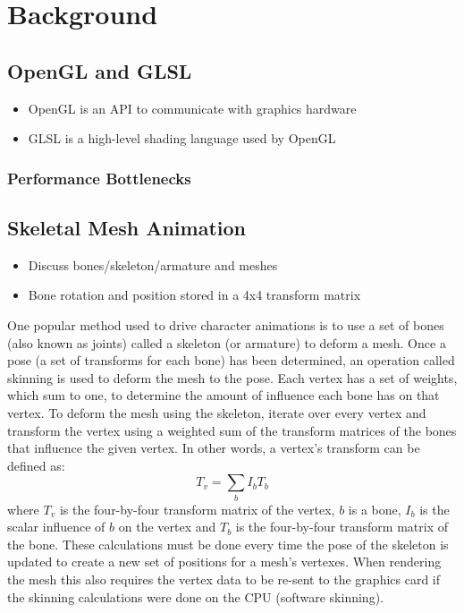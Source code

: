 \section{Background}

\subsection{OpenGL and GLSL}
\ifsummaries
\begin{itemize}
 \item OpenGL is an API to communicate with graphics hardware
 \item GLSL is a high-level shading language used by OpenGL
\end{itemize}
\fi


\subsubsection{Performance Bottlenecks}


\subsection{Skeletal Mesh Animation}
\ifsummaries
\begin{itemize}
 \item Discuss bones/skeleton/armature and meshes
 \item Bone rotation and position stored in a 4x4 transform matrix
\end{itemize}
\fi

One popular method used to drive character animations is to use a set of bones (also known as joints) called a skeleton (or armature) to deform a mesh.
Once a pose (a set of transforms for each bone) has been determined, an operation called skinning is used to deform the mesh to the pose.
Each vertex has a set of weights, which sum to one, to determine the amount of influence each bone has on that vertex.
To deform the mesh using the skeleton, iterate over every vertex and transform the vertex using a weighted sum of the transform matrices of the bones that influence the given vertex.
In other words, a vertex's transform can be defined as:\[T_v = \sum_b{I_bT_b}\]
where $T_v$ is the four-by-four transform matrix of the vertex, $b$ is a bone, $I_b$ is the scalar influence of $b$ on the vertex and $T_b$ is the four-by-four transform matrix of the bone.
These calculations must be done every time the pose of the skeleton is updated to create a new set of positions for a mesh's vertexes.
When rendering the mesh this also requires the vertex data to be re-sent to the graphics card if the skinning calculations were done on the CPU (software skinning).

